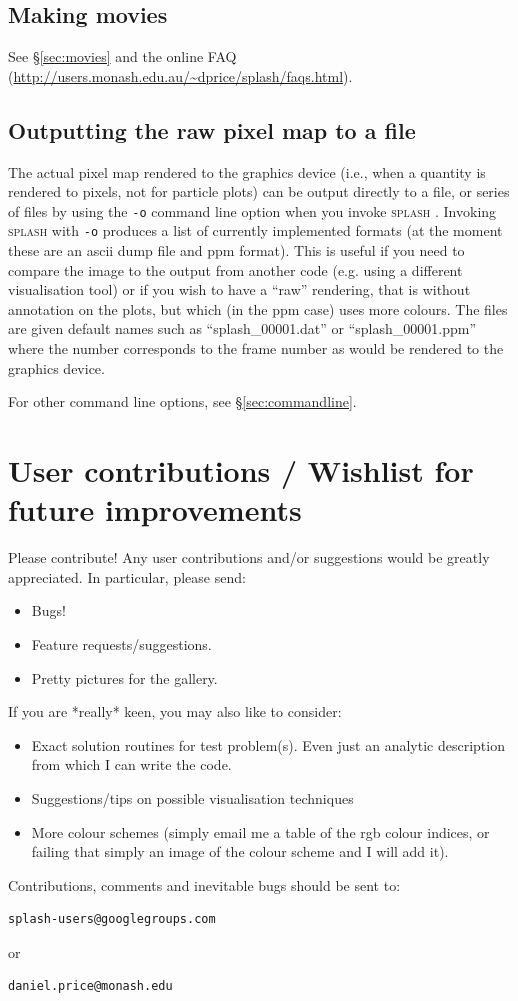 \documentclass[a4paper,10pt]{article}
\newcommand{\splash}{\textsc{splash }}
\begin{document}
\subsection{Making movies}
See \S\ref{sec:movies} and the online FAQ (\url{http://users.monash.edu.au/~dprice/splash/faqs.html}).

\subsection{Outputting the raw pixel map to a file}
\label{sec:writepixmap}
 The actual pixel map rendered to the graphics device (i.e., when a quantity is rendered to pixels, not for particle plots) can be output directly to a file, or series of files by using the \verb+-o+ command line option when you invoke \splash. Invoking \splash with \verb+-o+ produces a list of currently implemented formats (at the moment these are an ascii dump file and ppm format). This is useful if you need to compare the image to the output from another code (e.g. using a different visualisation tool) or if you wish to have a ``raw'' rendering, that is without annotation on the plots, but which (in the ppm case) uses more colours. The files are given default names such as ``splash\_00001.dat'' or ``splash\_00001.ppm'' where the number corresponds to the frame number as would be rendered to the graphics device.
 
  For other command line options, see \S\ref{sec:commandline}.

\section{User contributions / Wishlist for future improvements}%
 Please contribute! Any user contributions and/or suggestions would be greatly
appreciated. In particular, please send:
\begin{itemize}
\item Bugs!
\item Feature requests/suggestions.
\item Pretty pictures for the gallery.
\end{itemize}
If you are *really* keen, you may also like to consider:
\begin{itemize}
\item Exact solution routines for test problem(s). Even just an analytic description from which I can write the code.
\item Suggestions/tips on possible visualisation techniques
\item More colour schemes (simply email me a table of the rgb colour indices, or failing that simply an image of the colour scheme and I will add it).
\end{itemize}
Contributions, comments and inevitable bugs should be sent to:
\begin{verbatim}
splash-users@googlegroups.com
\end{verbatim}
or
\begin{verbatim}
daniel.price@monash.edu
\end{verbatim}
\end{document}
